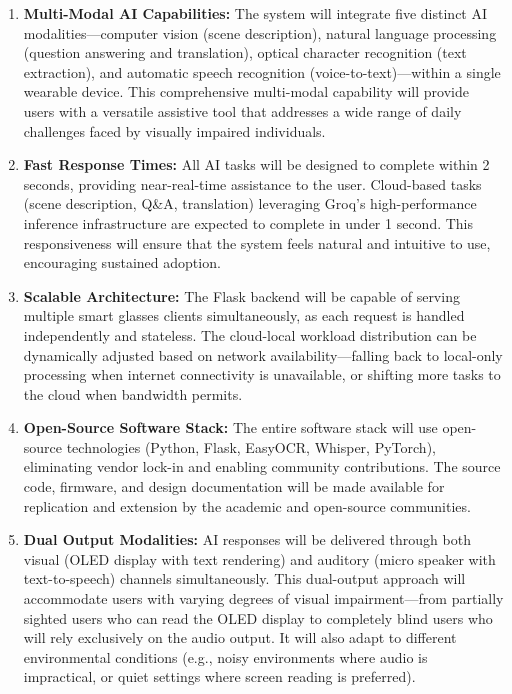 \begin{enumerate}[leftmargin=1.5cm]
\item \textbf{Multi-Modal AI Capabilities:} The system will integrate five distinct AI modalities---computer vision (scene description), natural language processing (question answering and translation), optical character recognition (text extraction), and automatic speech recognition (voice-to-text)---within a single wearable device. This comprehensive multi-modal capability will provide users with a versatile assistive tool that addresses a wide range of daily challenges faced by visually impaired individuals.

\item \textbf{Fast Response Times:} All AI tasks will be designed to complete within 2 seconds, providing near-real-time assistance to the user. Cloud-based tasks (scene description, Q\&A, translation) leveraging Groq's high-performance inference infrastructure are expected to complete in under 1 second. This responsiveness will ensure that the system feels natural and intuitive to use, encouraging sustained adoption.

\item \textbf{Scalable Architecture:} The Flask backend will be capable of serving multiple smart glasses clients simultaneously, as each request is handled independently and stateless. The cloud-local workload distribution can be dynamically adjusted based on network availability---falling back to local-only processing when internet connectivity is unavailable, or shifting more tasks to the cloud when bandwidth permits.

\item \textbf{Open-Source Software Stack:} The entire software stack will use open-source technologies (Python, Flask, EasyOCR, Whisper, PyTorch), eliminating vendor lock-in and enabling community contributions. The source code, firmware, and design documentation will be made available for replication and extension by the academic and open-source communities.

\item \textbf{Dual Output Modalities:} AI responses will be delivered through both visual (OLED display with text rendering) and auditory (micro speaker with text-to-speech) channels simultaneously. This dual-output approach will accommodate users with varying degrees of visual impairment---from partially sighted users who can read the OLED display to completely blind users who will rely exclusively on the audio output. It will also adapt to different environmental conditions (e.g., noisy environments where audio is impractical, or quiet settings where screen reading is preferred).
\end{enumerate}

